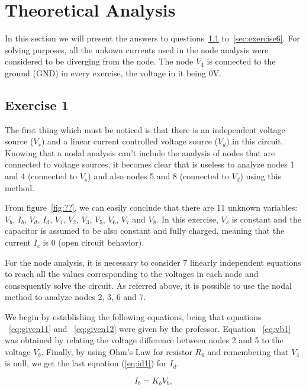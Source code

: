 \newpage
\section{Theoretical Analysis}
\label{sec:analysis}

In this section we will present the answers to questions~\ref{sec:exercise1} to~\ref{sec:exercise6}. For solving purposes, all the unkown currents used in the node analysis were considered to be diverging from the node. The node $V_4$ is connected to the ground (GND) in every exercise, the voltage in it being 0V.

\subsection{Exercise 1}
\label{sec:exercise1}


 
The first thing which must be noticed is that there is an independent voltage source ($V_s$) and a linear current controlled voltage source ($V_d$) in this circuit. Knowing that a nodal analysis can't include the analysis of nodes that are connected to voltage sources, it becomes clear that is useless to analyze nodes 1 and 4 (connected to $V_s$) and also nodes 5 and 8 (connected to $V_d$) using this method.

From figure~\ref{fig:??}, we can easily conclude that there are 11 unknown variables: $V_b$, $I_b$, $V_d$, $I_d$, $V_1$, $V_2$, $V_3$, $V_5$, $V_6$, $V_7$ and $V_8$. In this exercise, $V_s$ is constant and the capacitor is assumed to be also constant and fully charged, meaning that the current $I_c$ is 0 (open circuit behavior).

For the node analysis, it is necessary to consider 7 linearly independent equations to reach all the values corresponding to the voltages in each node and consequently solve the circuit. As referred above, it is possible to use the nodal method to analyze nodes 2, 3, 6 and 7.

We begin by establishing the following equations, being that equations ~\ref{eq:given11} and ~\ref{eq:given12} were given by the professor. Equation ~\ref{eq:vb1} was obtained by relating the voltage difference between nodes 2 and 5 to the voltage $V_b$. Finally, by using Ohm's Law for resistor $R_6$ and remembering that $V_4$ is null, we get the last equation (\ref{eq:id1}) for $I_d$.

\begin{equation}
  I_{b} = K_{b}V_{b} ,
  \label{eq:given11}
\end{equation}

